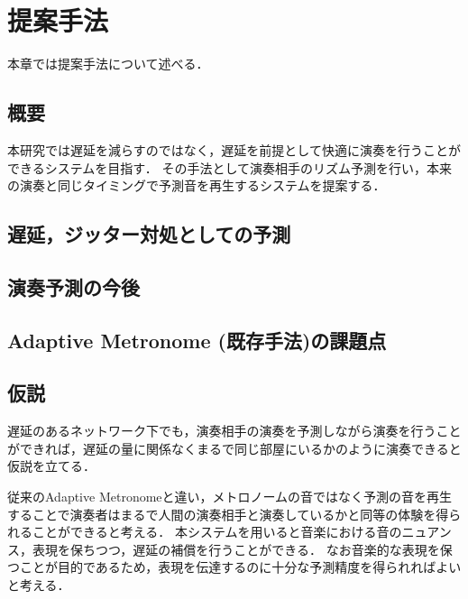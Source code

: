 \chapter{提案手法}
\label{proposed}

本章では提案手法について述べる．

\section{概要}
本研究では遅延を減らすのではなく，遅延を前提として快適に演奏を行うことができるシステムを目指す．
その手法として演奏相手のリズム予測を行い，本来の演奏と同じタイミングで予測音を再生するシステムを提案する．

\section{遅延，ジッター対処としての予測}

\section{演奏予測の今後}

\section{Adaptive Metronome (既存手法)の課題点}

\section{仮説}
遅延のあるネットワーク下でも，演奏相手の演奏を予測しながら演奏を行うことができれば，遅延の量に関係なくまるで同じ部屋にいるかのように演奏できると仮説を立てる．

従来のAdaptive Metronomeと違い，メトロノームの音ではなく予測の音を再生することで演奏者はまるで人間の演奏相手と演奏しているかと同等の体験を得られることができると考える．
本システムを用いると音楽における音のニュアンス，表現を保ちつつ，遅延の補償を行うことができる．
なお音楽的な表現を保つことが目的であるため，表現を伝達するのに十分な予測精度を得られればよいと考える．

